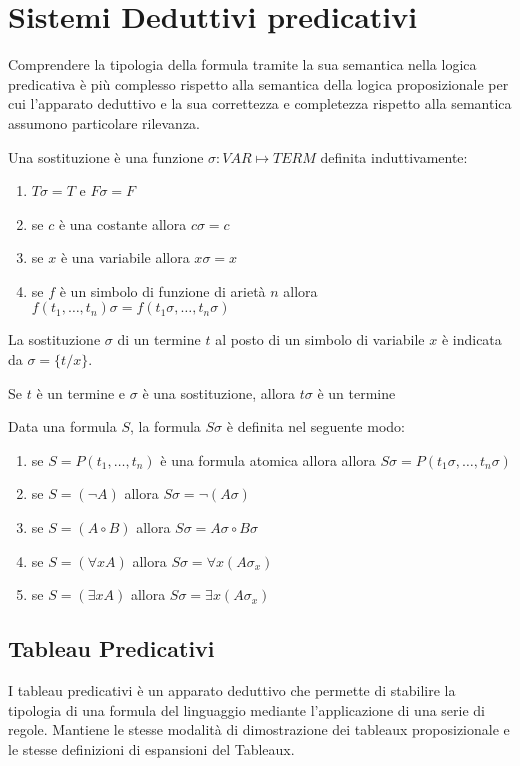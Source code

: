\section{Sistemi Deduttivi predicativi}
Comprendere la tipologia della formula tramite la sua semantica nella logica predicativa
è più complesso rispetto alla semantica della logica proposizionale per cui l'apparato deduttivo
e la sua correttezza e completezza rispetto alla semantica assumono particolare rilevanza.

\begin{defi}
Una sostituzione è una funzione $\sigma:VAR \mapsto TERM$ definita induttivamente:
\end{defi}
\begin{enumerate}
    \item $T\sigma = T$ e $F \sigma = F$
    \item se $c$ è una costante allora $c \sigma = c$
    \item se $x$ è una variabile allora $x \sigma = x$
    \item se $f$ è un simbolo di funzione di arietà $n$ allora
          $f(t_1,\dots,t_n)\sigma = f(t_1\sigma,\dots,t_n\sigma)$
\end{enumerate}
La sostituzione $\sigma$ di un termine $t$ al posto di un simbolo di variabile $x$
è indicata da $\sigma = \{t/x \}$.

\begin{lem}
Se $t$ è un termine e $\sigma$ è una sostituzione, allora $t\sigma$ è un termine
\end{lem}

\begin{defi}
    Data una formula $S$, la formula $S\sigma$ è definita nel seguente modo:
\end{defi}
\begin{enumerate}
    \item se $S = P(t_1,\dots,t_n)$ è una formula atomica allora
          allora $S\sigma = P(t_1\sigma,\dots,t_n\sigma)$
    \item se $S = (\neg A)$ allora $S \sigma = \neg(A \sigma)$
    \item se $S = (A \circ B)$ allora $S \sigma = A\sigma \circ B \sigma$
    \item se $S = (\forall x A)$ allora $S \sigma = \forall x (A  \sigma _ x)$
    \item se $S = (\exists x A)$ allora $S \sigma = \exists x (A \sigma _ x)$
\end{enumerate}
\subsection{Tableau Predicativi}
I tableau predicativi è un apparato deduttivo che permette di stabilire la tipologia
di una formula del linguaggio mediante l'applicazione di una serie di regole.
Mantiene le stesse modalità di dimostrazione dei tableaux proposizionale e le stesse
definizioni di espansioni del Tableaux.

